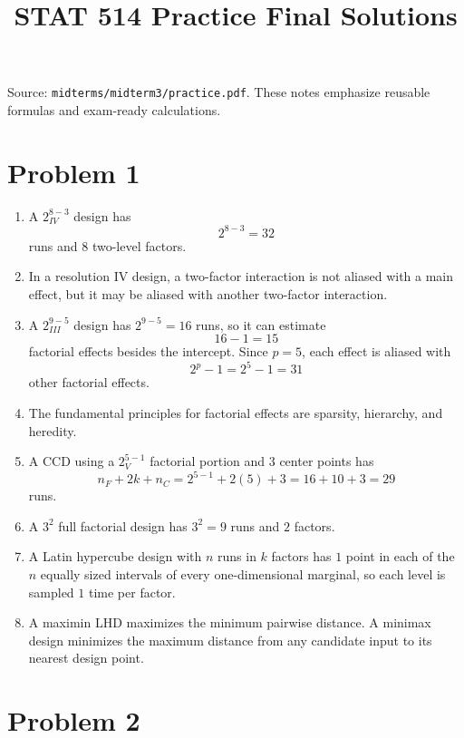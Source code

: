 \documentclass[11pt]{article}
\title{STAT 514 Practice Final Solutions}
\author{}
\date{}
\begin{document}
\maketitle

\noindent Source: \texttt{midterms/midterm3/practice.pdf}. These notes emphasize reusable formulas and exam-ready calculations.

\section*{Problem 1}

\begin{enumerate}[label=(\alph*)]
\item A \(2^{8-3}_{IV}\) design has
\[
2^{8-3}=32
\]
runs and \(8\) two-level factors.

\item In a resolution IV design, a two-factor interaction is not aliased with a main effect, but it may be aliased with another two-factor interaction.

\item A \(2^{9-5}_{III}\) design has \(2^{9-5}=16\) runs, so it can estimate
\[
16-1=15
\]
factorial effects besides the intercept. Since \(p=5\), each effect is aliased with
\[
2^p-1=2^5-1=31
\]
other factorial effects.

\item The fundamental principles for factorial effects are sparsity, hierarchy, and heredity.

\item A CCD using a \(2^{5-1}_V\) factorial portion and \(3\) center points has
\[
n_F+2k+n_C=2^{5-1}+2(5)+3=16+10+3=29
\]
runs.

\item A \(3^2\) full factorial design has \(3^2=9\) runs and \(2\) factors.

\item A Latin hypercube design with \(n\) runs in \(k\) factors has \(1\) point in each of the \(n\) equally sized intervals of every one-dimensional marginal, so each level is sampled \(1\) time per factor.

\item A maximin LHD maximizes the minimum pairwise distance. A minimax design minimizes the maximum distance from any candidate input to its nearest design point.
\end{enumerate}

\section*{Problem 2}
\end{document}
